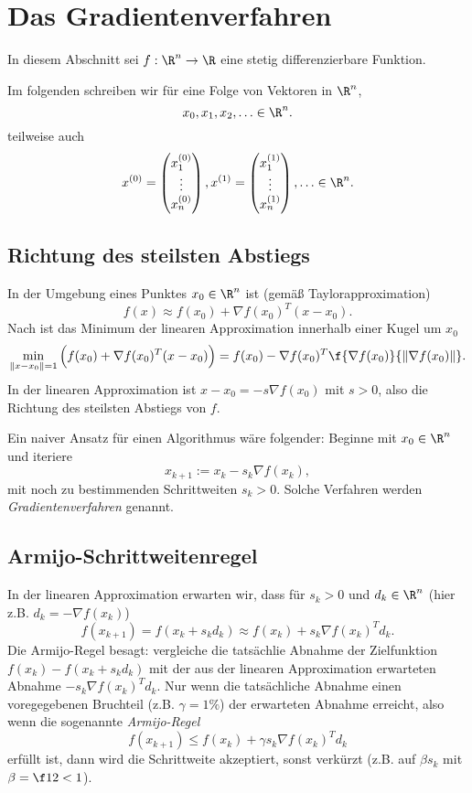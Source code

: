 \section{Das Gradientenverfahren}


In diesem Abschnitt sei $f: \R^n \to \R$ eine stetig differenzierbare Funktion.

\begin{conv*}
	Im folgenden schreiben wir für eine Folge von Vektoren in $\R^n$,
	\[
		x_0, x_1, x_2, \dotsc \in \R^n.
	\]
	teilweise auch
	\[
		x^{(0)} = \begin{pmatrix}
			x_1^{(0)} \\ \vdots \\ x_n^{(0)}
		\end{pmatrix},
		x^{(1)} = \begin{pmatrix}
			x_1^{(1)} \\ \vdots \\ x_n^{(1)}
		\end{pmatrix},
		\dotsc \in \R^n.
	\]
\end{conv*}

\subsection{Richtung des steilsten Abstiegs}

In der Umgebung eines Punktes $x_0 \in \R^n$ ist (gemäß Taylorapproximation)
\[
	f(x) \approx f(x_0) + \nabla f(x_0)^T (x-x_0).
\]
Nach 
ist das Minimum der linearen Approximation innerhalb einer Kugel um $x_0$
\[
	\min_{\|x-x_0\|=1} \Big( f(x_0) + \nabla f(x_0)^T (x-x_0) \Big)
	= f(x_0) - \nabla f(x_0)^T \f {\nabla f(x_0)}{\|\nabla f(x_0)\|}.
\]
In der linearen Approximation ist $x-x_0 = -s \nabla f(x_0)$ mit $s > 0$, also die Richtung des steilsten Abstiegs von $f$.

Ein naiver Ansatz für einen Algorithmus wäre folgender:
Beginne mit $x_0 \in \R^n$ und iteriere
\[
	x_{k+1} := x_k - s_k \nabla f(x_k),
\]
mit noch zu bestimmenden Schrittweiten $s_k > 0$.
Solche Verfahren werden \emph{Gradientenverfahren} genannt.

\subsection{Armijo-Schrittweitenregel}

In der linearen Approximation erwarten wir, dass für $s_k > 0$ und $d_k \in \R^n$ (hier z.B. $d_k = -\nabla f(x_k)$)
\[
	f(x_{k+1})
	= f(x_k + s_k d_k)
	\approx f(x_k) + s_k \nabla f(x_k)^T d_k.
\]
Die Armijo-Regel besagt:
vergleiche die tatsächlie Abnahme der Zielfunktion $f(x_k) - f(x_k + s_kd_k)$ mit der aus der linearen Approximation erwarteten Abnahme $-s_k \nabla f(x_k)^T d_k$.
Nur wenn die tatsächliche Abnahme einen voregegebenen Bruchteil (z.B. $\gamma = 1\%$) der erwarteten Abnahme erreicht, also wenn die sogenannte \emph{Armijo-Regel}
\[
	f(x_{k+1})
	\le f(x_k) + \gamma s_k \nabla f(x_k)^T d_k
\]
erfüllt ist, dann wird die Schrittweite akzeptiert, sonst verkürzt (z.B. auf $\beta s_k$ mit $\beta = \f 12 < 1$).


